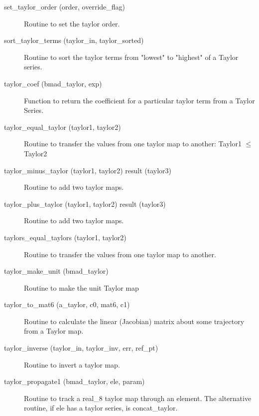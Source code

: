 \begin{description}
\label{r:set.taylor.order}
\item[set_taylor_order (order, override_flag)] \Newline
Routine to set the taylor order. 

\label{r:sort.taylor.terms}
\item[sort_taylor_terms (taylor_in, taylor_sorted)] \Newline
Routine to sort the taylor terms from "lowest" to "highest" of a
Taylor series.

\label{r:taylor.coef}
\item[taylor_coef (bmad_taylor, exp)] \Newline 
Function to return the coefficient for a particular taylor term from a
Taylor Series.

\label{r:taylor.equal.taylor}
\item[taylor_equal_taylor (taylor1, taylor2)] \Newline
Routine to transfer the values from one taylor map to another:
Taylor1 $\le$ Taylor2

\label{r:taylor.minus.taylor}
\item[taylor_minus_taylor (taylor1, taylor2) result (taylor3)] \Newline 
Routine to add two taylor maps.

\label{r:taylor.plus.taylor}
\item[taylor_plus_taylor (taylor1, taylor2) result (taylor3)] \Newline 
Routine to add two taylor maps.

\label{r:taylors.equal.taylors}
\item[taylors_equal_taylors (taylor1, taylor2)] \Newline 
Routine to transfer the values from one taylor map to another.

\label{r:taylor.make.unit}
\item[taylor_make_unit (bmad_taylor)] \Newline
Routine to make the unit Taylor map

\label{r:taylor.to.mat6}
\item[taylor_to_mat6 (a_taylor, c0, mat6, c1)] \Newline
Routine to calculate the linear (Jacobian) matrix about some
trajectory from a Taylor map.

\label{r:taylor.inverse}
\item[taylor_inverse (taylor_in, taylor_inv, err, ref_pt)] \Newline
Routine to invert a taylor map. 

\label{r:taylor.propagate1}
\item[taylor_propagate1 (bmad_taylor, ele, param)] \Newline
Routine to track a real_8 taylor map through an element. 
The alternative routine, if ele has a taylor series, is concat_taylor. 


\end{description}
